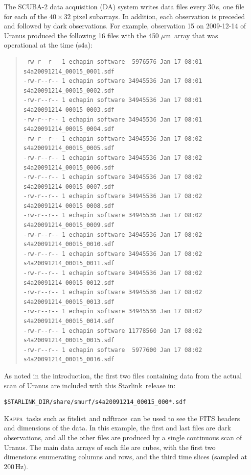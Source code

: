 \documentclass[twoside,11pt]{article}
\newcommand{\micron}{\mbox{\,${\mu}$m}}            %
\newcommand{\htmladdnormallink}[2]{#1}
\newcommand{\xref}[3]{#1}
\renewcommand{\_}{\texttt{\symbol{95}}}
\newenvironment{myquote}{\begin{quote}\begin{small}}{\end{small}\end{quote}}
\newcommand{\starlink}{\htmladdnormallink{Starlink}{http://starlink.jach.hawaii.edu}}
\newcommand{\Kappa}{\xref{\textsc{Kappa}}{sun95}{}}
\newcommand{\task}[1]{\textsf{#1}}
\newcommand{\fitslist}{\xref{\task{fitslist}}{sun95}{FITSLIST}}
\newcommand{\ndftrace}{\xref{\task{ndftrace}}{sun95}{NDFTRACE}}
\begin{document}
The SCUBA-2 data acquisition (DA) system writes data files every
30\,s, one file for each of the $40\times32$ pixel subarrays. In
addition, each observation is preceded and followed by dark
observations. For example, observation 15 on 2009-12-14 of Uranus
produced the following 16 files with the 450\,\micron\ array that was
operational at the time (s4a):

\begin{myquote}
\begin{verbatim}
-rw-r--r-- 1 echapin software  5976576 Jan 17 08:01 s4a20091214_00015_0001.sdf
-rw-r--r-- 1 echapin software 34945536 Jan 17 08:01 s4a20091214_00015_0002.sdf
-rw-r--r-- 1 echapin software 34945536 Jan 17 08:01 s4a20091214_00015_0003.sdf
-rw-r--r-- 1 echapin software 34945536 Jan 17 08:01 s4a20091214_00015_0004.sdf
-rw-r--r-- 1 echapin software 34945536 Jan 17 08:02 s4a20091214_00015_0005.sdf
-rw-r--r-- 1 echapin software 34945536 Jan 17 08:02 s4a20091214_00015_0006.sdf
-rw-r--r-- 1 echapin software 34945536 Jan 17 08:02 s4a20091214_00015_0007.sdf
-rw-r--r-- 1 echapin software 34945536 Jan 17 08:02 s4a20091214_00015_0008.sdf
-rw-r--r-- 1 echapin software 34945536 Jan 17 08:02 s4a20091214_00015_0009.sdf
-rw-r--r-- 1 echapin software 34945536 Jan 17 08:02 s4a20091214_00015_0010.sdf
-rw-r--r-- 1 echapin software 34945536 Jan 17 08:02 s4a20091214_00015_0011.sdf
-rw-r--r-- 1 echapin software 34945536 Jan 17 08:02 s4a20091214_00015_0012.sdf
-rw-r--r-- 1 echapin software 34945536 Jan 17 08:02 s4a20091214_00015_0013.sdf
-rw-r--r-- 1 echapin software 34945536 Jan 17 08:02 s4a20091214_00015_0014.sdf
-rw-r--r-- 1 echapin software 11778560 Jan 17 08:02 s4a20091214_00015_0015.sdf
-rw-r--r-- 1 echapin software  5977600 Jan 17 08:02 s4a20091214_00015_0016.sdf
\end{verbatim}
\end{myquote}

As noted in the introduction, the first two files containing data from
the actual scan of Uranus are included with this \starlink\ release in:
\begin{verbatim}
$STARLINK_DIR/share/smurf/s4a20091214_00015_000*.sdf
\end{verbatim}

\Kappa\ tasks such as \fitslist\ and \ndftrace\ can be used to see the
FITS headers and dimensions of the data. In this example, the first
and last files are dark observations, and all the other files are
produced by a single continuous scan of Uranus. The main data arrays
of each file are cubes, with the first two dimensions enumerating
columns and rows, and the third time slices (sampled at 200\,Hz).
\end{document}
